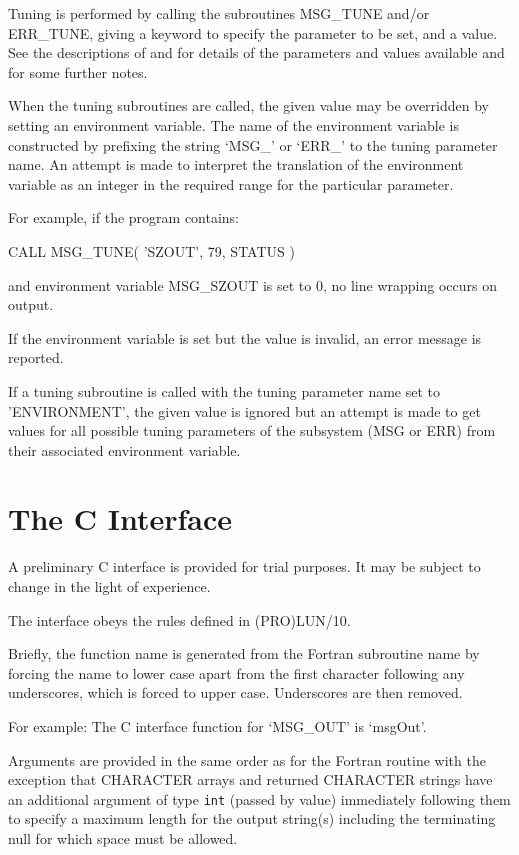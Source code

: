\documentclass[twoside,11pt]{starlink}
\begin{document}
Tuning is performed by calling the subroutines MSG\_TUNE and/or ERR\_TUNE,
giving a keyword to specify the parameter to be set, and a value.
See the descriptions of
and
for details of the parameters and values available and for some further notes.

When the tuning subroutines are called, the given value may be overridden by
setting an environment variable.  The name of the environment variable is
constructed by prefixing the string `MSG\_' or `ERR\_' to the tuning parameter
name. An attempt is made to interpret the translation of the environment
variable as an integer in the required range for the particular parameter.

For example, if the program contains:
\begin{terminalv}
CALL MSG_TUNE( 'SZOUT', 79, STATUS )
\end{terminalv}
and environment variable MSG\_SZOUT is set to 0, no line wrapping occurs
on output.

If the environment variable is set but the value is invalid, an error message
is reported.

If a tuning subroutine is called with the tuning parameter name set to
'ENVIRONMENT', the given value is ignored but an attempt is made to get values
for all possible tuning parameters of the subsystem (MSG or ERR) from their
associated environment variable.

\newpage
\section{\label{the_c_interface}The C Interface}
A preliminary C interface is provided for trial purposes. It may be subject to
change in the light of experience.

The interface obeys the rules defined in (PRO)LUN/10.

Briefly, the function name is generated from the Fortran subroutine name by
forcing the name to lower case apart from the first character following any
underscores, which is forced to upper case. Underscores are then removed.

For example: The C interface function for `MSG\_OUT' is `msgOut'.

Arguments are provided in the same order as for the Fortran routine with the
exception that CHARACTER arrays and returned CHARACTER strings
have an additional argument of type \texttt{int} (passed by value) immediately
following them to specify a maximum length for the output string(s) including
the terminating null for which space must be allowed.
\end{document}
